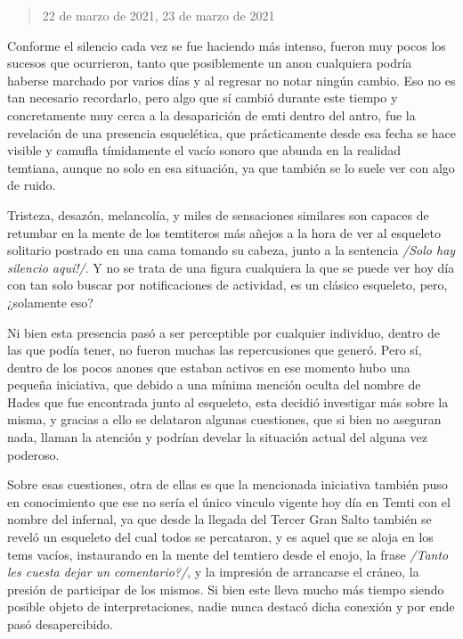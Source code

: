 \documentclass[
  spanish,
]{book}
\begin{document}
\begin{quote}
22 de marzo de 2021, 23 de marzo de 2021
\end{quote}

Conforme el silencio cada vez se fue haciendo más intenso, fueron muy pocos los sucesos que ocurrieron, tanto que posiblemente un anon cualquiera podría haberse marchado por varios días y al regresar no notar ningún cambio. Eso no es tan necesario recordarlo, pero algo que sí cambió durante este tiempo y concretamente muy cerca a la desaparición de emti dentro del antro, fue la revelación de una presencia esquelética, que prácticamente desde esa fecha se hace visible y camufla tímidamente el vacío sonoro que abunda en la realidad temtiana, aunque no solo en esa situación, ya que también se lo suele ver con algo de ruido.

Tristeza, desazón, melancolía, y miles de sensaciones similares son capaces de retumbar en la mente de los temtiteros más añejos a la hora de ver al esqueleto solitario postrado en una cama tomando su cabeza, junto a la sentencia \emph{/Solo hay silencio aquí!/}. Y no se trata de una figura cualquiera la que se puede ver hoy día con tan solo buscar por notificaciones de actividad, es un clásico esqueleto, pero, ¿solamente eso?

Ni bien esta presencia pasó a ser perceptible por cualquier individuo, dentro de las que podía tener, no fueron muchas las repercusiones que generó. Pero sí, dentro de los pocos anones que estaban activos en ese momento hubo una pequeña iniciativa, que debido a una mínima mención oculta del nombre de Hades que fue encontrada junto al esqueleto, esta decidió investigar más sobre la misma, y gracias a ello se delataron algunas cuestiones, que si bien no aseguran nada, llaman la atención y podrían develar la situación actual del alguna vez poderoso.

Sobre esas cuestiones, otra de ellas es que la mencionada iniciativa también puso en conocimiento que ese no sería el único vinculo vigente hoy día en Temti con el nombre del infernal, ya que desde la llegada del Tercer Gran Salto también se reveló un esqueleto del cual todos se percataron, y es aquel que se aloja en los tems vacíos, instaurando en la mente del temtiero desde el enojo, la frase \emph{/Tanto les cuesta dejar un comentario?/}, y la impresión de arrancarse el cráneo, la presión de participar de los mismos. Si bien este lleva mucho más tiempo siendo posible objeto de interpretaciones, nadie nunca destacó dicha conexión y por ende pasó desapercibido.
\end{document}
